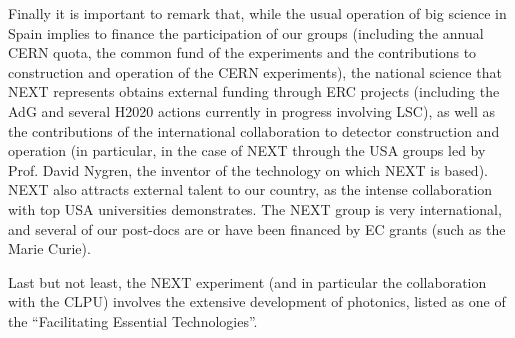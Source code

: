 Finally it is important to remark that, while the usual operation of big science in Spain implies to finance the participation of our groups (including the annual CERN quota, the common fund of the experiments and the contributions to construction and operation of the CERN experiments), the national science that NEXT represents obtains external funding through ERC projects (including the AdG and several H2020 actions currently in progress involving LSC), as well as the contributions of the international collaboration to detector construction and operation (in particular, in the case of NEXT through the USA groups led by Prof. David Nygren, the inventor of the technology on which NEXT is based). NEXT also attracts external talent to our country, as the intense collaboration with top USA universities demonstrates. The NEXT group is very international, and several of our post-docs are or have been financed by EC grants (such as the Marie Curie). 

Last but not least, the NEXT experiment (and in particular the collaboration with the CLPU) involves the extensive development of photonics, listed as one of the  ``Facilitating Essential Technologies''.